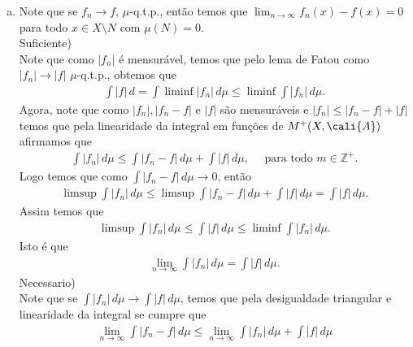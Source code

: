 \begin{homeworkProblem}[4]
\begin{solution}
\begin{enumerate}[a)]
      \begin{align*}
        \int g\,d\mu=\int \sum_{n=1}^{\infty}|f_n|\,d\mu=\sum_{n=1}^{\infty}\int |f_n|\,d\mu.
      \end{align*}
      Portanto temos que $g$ é $\mu$-integrável, pelo que usando o teorema da convergência dominada temos que a série $\sum f_n$ converge $\mu$-q.t.p para uma função mensurável $f$ tal que
      \begin{align*}
        \int f\,d\mu=\int \lim_{n \to \infty}g_n\,d\mu=\lim_{n \to \infty}\int g_n\,d\mu=\lim_{n \to \infty}\sum_{i=1}^{n}\int f_i\,d\mu=\sum_{n=1}^{\infty}\int f_n\,d\mu.
      \end{align*}
      \item Note que se $f_n\to f,\, \mu$-q.t.p., então temos que $\lim_{n \to \infty}f_n(x)-f(x)=0$ para todo $x\in X\setminus N$ com $\mu(N)=0$.\\
        Suficiente)\\
        Note que como $|f_n|$ é mensurável,  temos que pelo lema de Fatou como $|f_n|\to |f|$ $\mu$-q.t.p., obtemos que
        \begin{align*}
          \int |f|\,d=\int \liminf |f_n|\,d\mu\leq \liminf \int |f_n|\,d\mu.
        \end{align*}
        Agora, note que como $|f_n|,|f_n-f|$ e $|f|$ são mensuráveis e $|f_n|\leq |f_n-f|+|f|$ temos que pela linearidade da integral em funções de $M^{+}(X,\cali{A})$ afirmamos que
        \begin{align*}
          \int |f_n|\,d\mu \leq \int |f_n-f|\,d\mu + \int |f|\,d\mu,\quad\text{ para todo }m\in\mathbb{Z}^{+}.
        \end{align*}
        Logo temos que como $\int |f_n-f|\,d\mu\to 0$, então
        \begin{align*}
          \limsup \int |f_n|\,d\mu \leq \limsup \int |f_n-f|\,d\mu + \int |f|\,d\mu = \int|f|\,d\mu.
        \end{align*}
        Assim temos que
        \begin{align*}
          \limsup \int |f_n|\,d\mu \leq \int |f|\,d\mu \leq \liminf \int |f_n|\,d\mu.
        \end{align*}
        Isto é que
        \begin{align*}
          \lim_{n \to \infty}\int |f_n|\,d\mu = \int |f|\,d\mu.
        \end{align*}
        Necessario)\\
        Note que se $\int |f_n|\,d\mu\to \int |f|\,d\mu$, temos que pela desigualdade triangular e linearidade da integral se cumpre que
        \begin{align*}
          \lim_{n \to \infty}\int |f_n-f|\,d\mu\leq \lim_{n \to \infty} \int |f_n|\,d\mu + \int |f|\,d\mu 
        \end{align*}
  \end{enumerate} 
  \end{solution}
\end{homeworkProblem}
